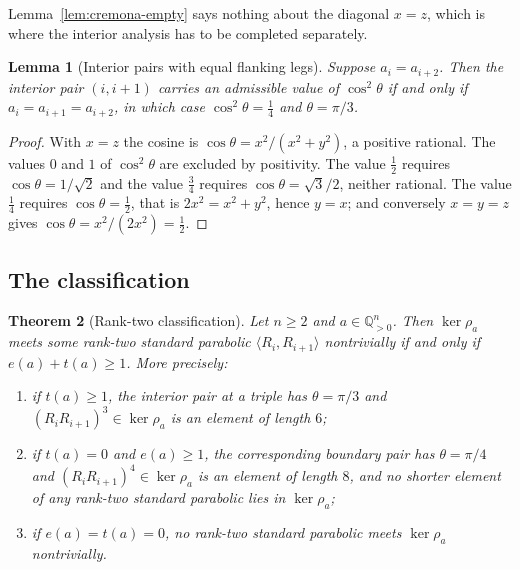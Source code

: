 \documentclass[11pt,a4paper]{article}
\newcommand{\Q}{\mathbb{Q}}
\newtheorem{theorem}{Theorem}
\newtheorem{lemma}[theorem]{Lemma}
\theoremstyle{definition}
\theoremstyle{remark}
\theoremstyle{plain}
\begin{document}
Lemma~\ref{lem:cremona-empty} says nothing about the diagonal $x=z$, which is where the interior
analysis has to be completed separately.

\begin{lemma}[Interior pairs with equal flanking legs]\label{lem:diagonal}
Suppose $a_i=a_{i+2}$. Then the interior pair $(i,i+1)$ carries an admissible value of
$\cos^2\theta$ if and only if $a_i=a_{i+1}=a_{i+2}$, in which case $\cos^2\theta=\tfrac14$ and
$\theta=\pi/3$.
\end{lemma}

\begin{proof}
With $x=z$ the cosine is $\cos\theta=x^2/(x^2+y^2)$, a positive rational. The values $0$ and $1$
of $\cos^2\theta$ are excluded by positivity. The value $\tfrac12$ requires
$\cos\theta=1/\sqrt2$ and the value $\tfrac34$ requires $\cos\theta=\sqrt3/2$, neither rational.
The value $\tfrac14$ requires $\cos\theta=\tfrac12$, that is $2x^2=x^2+y^2$, hence $y=x$; and
conversely $x=y=z$ gives $\cos\theta=x^2/(2x^2)=\tfrac12$.
\end{proof}

\subsection{The classification}

\begin{theorem}[Rank-two classification]\label{thm:rank2}
Let $n\ge2$ and $a\in\Q_{>0}^n$. Then $\ker\rho_a$ meets some rank-two standard parabolic
$\langle R_i,R_{i+1}\rangle$ nontrivially if and only if $e(a)+t(a)\ge1$. More precisely:
\begin{enumerate}[label=(\roman*),leftmargin=2.2em]
\item if $t(a)\ge1$, the interior pair at a triple has $\theta=\pi/3$ and
$(R_iR_{i+1})^3\in\ker\rho_a$ is an element of length $6$;
\item if $t(a)=0$ and $e(a)\ge1$, the corresponding boundary pair has $\theta=\pi/4$ and
$(R_iR_{i+1})^4\in\ker\rho_a$ is an element of length $8$, and no shorter element of any
rank-two standard parabolic lies in $\ker\rho_a$;
\item if $e(a)=t(a)=0$, no rank-two standard parabolic meets $\ker\rho_a$ nontrivially.
\end{enumerate}
\end{theorem}
\end{document}
